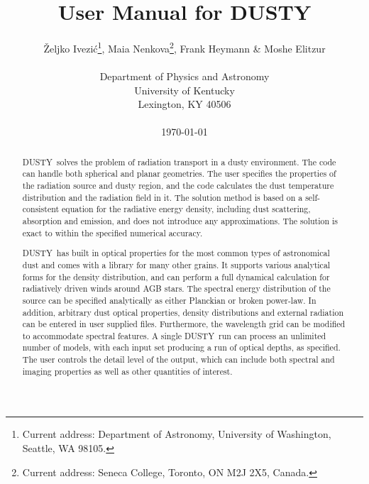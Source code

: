 \documentclass[11pt]{article}
\def\D    {{\sf DUSTY}}
\def\Ivezic {Ivezi\'c}
\begin{document}
\title{User Manual for DUSTY}

\author{\v Zeljko \Ivezic\footnote{Current address: Department of
    Astronomy, University of Washington, Seattle, WA 98105.}, Maia
  Nenkova\footnote{Current address: Seneca College, Toronto, ON M2J
    2X5, Canada.},
  Frank Heymann \& Moshe Elitzur\\
  \\Department of Physics and Astronomy\\
  University of Kentucky\\
  Lexington, KY 40506\\
  \\ \today
} \date{}

\maketitle \thispagestyle{empty}

\vfil
\begin{abstract}

  {\D\ solves the problem of radiation transport in a dusty
    environment. The code can handle both spherical and planar
    geometries. The user specifies the properties of the radiation
    source and dusty region, and the code calculates the dust
    temperature distribution and the radiation field in it. The
    solution method is based on a self-consistent equation for the
    radiative energy density, including dust scattering, absorption
    and emission, and does not introduce any approximations. The
    solution is exact to within the specified numerical accuracy.

    \D\ has built in optical properties for the most common types of
    astronomical dust and comes with a library for many other
    grains. It supports various analytical forms for the density
    distribution, and can perform a full dynamical calculation for
    radiatively driven winds around AGB stars. The spectral energy
    distribution of the source can be specified analytically as either
    Planckian or broken power-law. In addition, arbitrary dust optical
    properties, density distributions and external radiation can be
    entered in user supplied files.  Furthermore, the wavelength grid
    can be modified to accommodate spectral features.  A single \D\
    run can process an unlimited number of models, with each input set
    producing a run of optical depths, as specified. The user controls
    the detail level of the output, which can include both spectral
    and imaging properties as well as other quantities of interest.}

\end{abstract}
\end{document}
